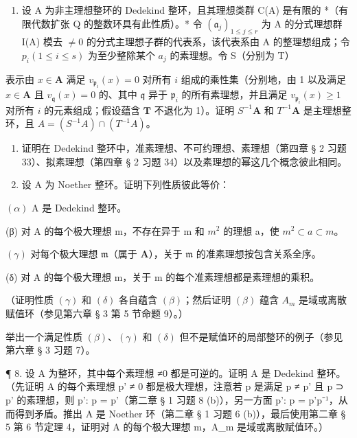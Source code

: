 \begin{enumerate}
\def\labelenumi{(\alph{enumi})}
\setcounter{enumi}{1}
\tightlist
\item
  设 A 为非主理想整环的 Dedekind 整环，且其理想类群 C(A) 是有限的 *（有限代数扩张 Q 的整数环具有此性质）。* 令 \((\mathfrak{a}_{j})_{1 \leqslant j \leqslant r}\) 为 A 的分式理想群 I(A) 模去 \(\neq 0\) 的分式主理想子群的代表系，该代表系由 A 的整理想组成；令 \(p_{i} (1 \leqslant i \leqslant s)\) 为至少整除某个 \(a_{j}\) 的素理想。令 S（分别为 T）
\end{enumerate}

表示由 \(x \in \mathbf{A}\) 满足 \(v_{\mathfrak{p}_i}(x) = 0\) 对所有 \(i\) 组成的乘性集（分别地，由 1 以及满足 \(x \in \mathbf{A}\) 且 \(v_{\mathfrak{q}}(x) = 0\) 的、其中 \(\mathfrak{q}\) 异于 \(\mathfrak{p}_i\) 的所有素理想，并且满足 \(v_{\mathfrak{p}_i}(x) \geqslant 1\) 对所有 \(i\) 的元素组成；假设蕴含 \(\mathbf{T}\) 不退化为 1）。证明 \(S^{-1}\mathbf{A}\) 和 \(T^{-1}\mathbf{A}\) 是主理想整环，且 \(A = (S^{-1}A) \cap (T^{-1}A)\)。

\begin{enumerate}
\def\labelenumi{\arabic{enumi}.}
\setcounter{enumi}{5}
\item
  证明在 Dedekind 整环中，准素理想、不可约理想、素理想（第四章 § 2 习题 33）、拟素理想（第四章 § 2 习题 34）以及素理想的幂这几个概念彼此相同。
\item
  设 A 为 Noether 整环。证明下列性质彼此等价：
\end{enumerate}

\((\alpha)\) A 是 Dedekind 整环。

(β) 对 A 的每个极大理想 m，不存在异于 m 和 \(m^{2}\) 的理想 a，使 \(m^{2} \subset a \subset m\)。

\((\gamma)\) 对每个极大理想 \(\mathfrak{m}\)（属于 \(\mathbf{A}\)），关于 \(\mathfrak{m}\) 的准素理想按包含关系全序。

(δ) 对 A 的每个极大理想 m，关于 m 的每个准素理想都是素理想的乘积。

（证明性质 \((\gamma)\) 和 \((\delta)\) 各自蕴含 \((\beta)\)；然后证明 \((\beta)\) 蕴含 \(A_{m}\) 是域或离散赋值环（参见第六章 § 3 第 5 节命题 9）。）

举出一个满足性质 \((\beta)\)、\((\gamma)\) 和 \((\delta)\) 但不是赋值环的局部整环的例子（参见第六章 § 3 习题 7）。

¶ 8. 设 A 为整环，其中每个素理想 ≠0 都是可逆的。证明 A 是 Dedekind 整环。（先证明 A 的每个素理想 p' ≠ 0 都是极大理想，注意若 p 是满足 p ≠ p' 且 p ⊃ p' 的素理想，则 p': p = p'（第二章 § 1 习题 8 (b)），另一方面 p': p = p'p⁻¹，从而得到矛盾。推出 A 是 Noether 环（第二章 § 1 习题 6 (b)），最后使用第二章 § 5 第 6 节定理 4，证明对 A 的每个极大理想 m，A\_m 是域或离散赋值环。）

